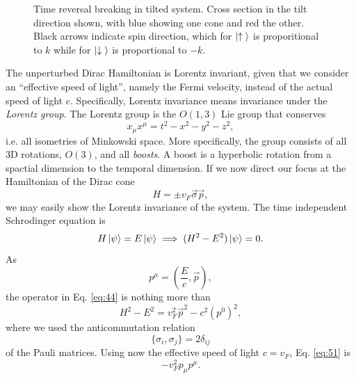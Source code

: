 \begin{figure}[h]
  \centering
  \caption{Time reversal breaking in tilted system.
    Cross section in the tilt direction shown, with blue showing one cone and red the other.
    Black arrows indicate spin direction, which for \(\ket{\uparrow {}}\) is proporitional to  \(k\) while for \(\ket{\downarrow {}}\) is proportional to \( -k \).
  }
\end{figure}

The unperturbed Dirac Hamiltonian is Lorentz invariant, given that we consider an ``effective speed of light'', namely the Fermi velocity, instead of the actual speed of light \( c \).
Specifically, Lorentz invariance means invariance under the \emph{Lorentz group}.
The Lorentz group is the \( O(1,3) \) Lie group that conserves
\[
x_{\mu } x^{\mu } = t^2 - x^2 - y^2 - z^2,
\]
i.e. all isometries of Minkowski space.
More specifically, the group consists of all 3D rotations, \( O(3) \), and all \emph{boosts}.
A boost is a hyperbolic rotation from a spactial dimension to the temporal dimension.
If we now direct our focus at the Hamiltonian of the Dirac cone
\[
H = \pm v_{F} \vec{\sigma} \vec{p},
\]
we may easily show the Lorentz invariance of the system.
The time independent Schrodinger equation is
\begin{equation}
  \label{eq:44}
  H \ket{\psi } = E \ket{\psi } \implies (H^2 - E^2) \ket{\psi } = 0.
\end{equation}
As
\[
p^{\mu } = \left(\frac{E}{c}, \vec{p}\right),
\]
the operator in Eq. \eqref{eq:44} is nothing more than
\begin{equation}
  \label{eq:51}
  H^2-E^2 = v_{F}^2 \vec{p}^2 - c^2 \left(p^0\right)^2 ,
\end{equation}
where we used the anticommutation relation
\[
\{\sigma_{i}, \sigma_{j}\} =  2 \delta _{ij}
\]
of the Pauli matrices.
Using now the effective speed of light \( c=v_F \), Eq. \eqref{eq:51} is
\begin{equation}
  \label{eq:52}
  - v_F^2 p_{\mu } p^{\mu }.
\end{equation}


